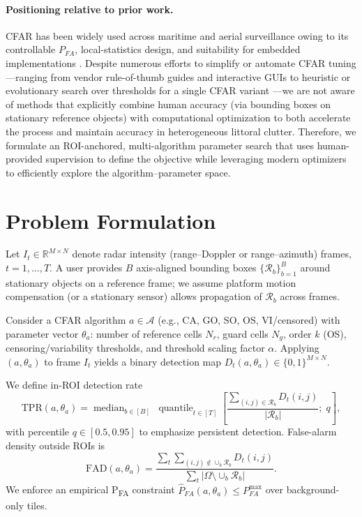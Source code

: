 \documentclass[10pt,letterpaper]{article}
\begin{document}
\paragraph{Positioning relative to prior work.} CFAR has been widely used across maritime and aerial surveillance owing to its controllable $P_{FA}$, local-statistics design, and suitability for embedded implementations \cite{farina2005review,gandhi1988,ward2006}. Despite numerous efforts to simplify or automate CFAR tuning—ranging from vendor rule-of-thumb guides and interactive GUIs to heuristic or evolutionary search over thresholds for a single CFAR variant \cite{mathworksCFAR,katzlberger2018,zenodoRTOSCFAR}—we are not aware of methods that explicitly combine human accuracy (via bounding boxes on stationary reference objects) with computational optimization to both accelerate the process and maintain accuracy in heterogeneous littoral clutter. Therefore, we formulate an ROI-anchored, multi-algorithm parameter search that uses human-provided supervision to define the objective while leveraging modern optimizers to efficiently explore the algorithm–parameter space.

\section{Problem Formulation}
Let \(I_t \in \mathbb{R}^{M\times N}\) denote radar intensity (range--Doppler or range--azimuth) frames, \(t = 1,\dots,T\). A user provides \(B\) axis-aligned bounding boxes \(\{\mathcal{R}_b\}_{b=1}^B\) around stationary objects on a reference frame; we assume platform motion compensation (or a stationary sensor) allows propagation of \(\mathcal{R}_b\) across frames.

Consider a CFAR algorithm \(a\in\mathcal{A}\) (e.g., CA, GO, SO, OS, VI/censored) with parameter vector \(\theta_a\): number of reference cells \(N_r\), guard cells \(N_g\), order \(k\) (OS), censoring/variability thresholds, and threshold scaling factor \(\alpha\). Applying \((a,\theta_a)\) to frame \(I_t\) yields a binary detection map \(D_t(a,\theta_a)\in\{0,1\}^{M\times N}\).

We define in-ROI detection rate
\begin{equation}
\mathrm{TPR}(a,\theta_a) 
= \operatorname{median}_{b\in [B]}\;\operatorname{quantile}_{t\in[T]}\left[ \frac{\sum_{(i,j)\in\mathcal{R}_b} D_t(i,j)}{|\mathcal{R}_b|} ;\; q\right],
\end{equation}
with percentile \(q\in[0.5,0.95]\) to emphasize persistent detection. False-alarm density outside ROIs is
\begin{equation}
\mathrm{FAD}(a,\theta_a)=\frac{\sum_{t}\sum_{(i,j)\notin\cup_b \mathcal{R}_b} D_t(i,j)}{\sum_{t} |\Omega\setminus\cup_b \mathcal{R}_b|}.
\end{equation}
We enforce an empirical P\textsubscript{FA} constraint \(\widehat{P}_{FA}(a,\theta_a)\le P_{FA}^{\max}\) over background-only tiles.
\end{document}
